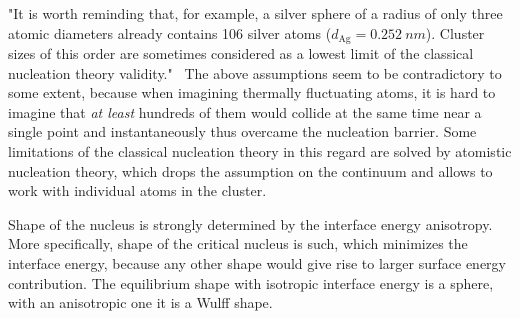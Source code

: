 "It is worth reminding that, for example, a silver sphere of a radius of only three atomic diameters already contains 106 silver atoms ($d_{\mathrm{Ag}} = \qty{0.252}{nm}$). Cluster sizes of this order are sometimes considered as a lowest limit of the classical nucleation theory validity."~\cite{Milchev2008} The above assumptions seem to be contradictory to some extent, because when imagining thermally fluctuating atoms, it is hard to imagine that \textit{at least} hundreds of them would collide at the same time near a single point and instantaneously thus overcame the nucleation barrier. Some limitations of the classical nucleation theory in this regard are solved by atomistic nucleation theory, which drops the assumption on the continuum and allows to work with individual atoms in the cluster.





Shape of the nucleus is strongly determined by the interface energy anisotropy. More specifically, shape of the critical nucleus is such, which minimizes the interface energy, because any other shape would give rise to larger surface energy contribution. The equilibrium shape with isotropic interface energy is a sphere, with an anisotropic one it is a Wulff shape.

